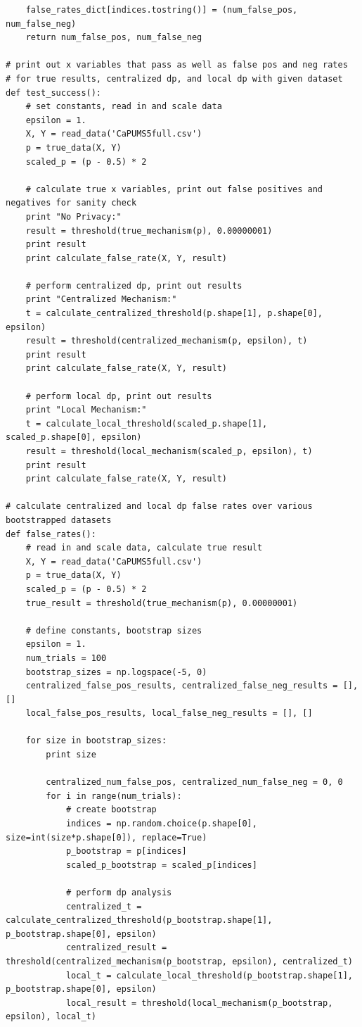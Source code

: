 \documentclass[12pt]{article}
\begin{document}
\begin{appendices}
\begin{lstlisting}
    false_rates_dict[indices.tostring()] = (num_false_pos, num_false_neg)
    return num_false_pos, num_false_neg

# print out x variables that pass as well as false pos and neg rates
# for true results, centralized dp, and local dp with given dataset
def test_success():
    # set constants, read in and scale data
    epsilon = 1.
    X, Y = read_data('CaPUMS5full.csv')
    p = true_data(X, Y)
    scaled_p = (p - 0.5) * 2

    # calculate true x variables, print out false positives and negatives for sanity check
    print "No Privacy:"
    result = threshold(true_mechanism(p), 0.00000001)
    print result
    print calculate_false_rate(X, Y, result)

    # perform centralized dp, print out results
    print "Centralized Mechanism:"
    t = calculate_centralized_threshold(p.shape[1], p.shape[0], epsilon)
    result = threshold(centralized_mechanism(p, epsilon), t)
    print result
    print calculate_false_rate(X, Y, result)

    # perform local dp, print out results
    print "Local Mechanism:"
    t = calculate_local_threshold(scaled_p.shape[1], scaled_p.shape[0], epsilon)
    result = threshold(local_mechanism(scaled_p, epsilon), t)
    print result
    print calculate_false_rate(X, Y, result)

# calculate centralized and local dp false rates over various bootstrapped datasets
def false_rates():
    # read in and scale data, calculate true result
    X, Y = read_data('CaPUMS5full.csv')
    p = true_data(X, Y)
    scaled_p = (p - 0.5) * 2
    true_result = threshold(true_mechanism(p), 0.00000001)

    # define constants, bootstrap sizes
    epsilon = 1.
    num_trials = 100
    bootstrap_sizes = np.logspace(-5, 0)
    centralized_false_pos_results, centralized_false_neg_results = [], []
    local_false_pos_results, local_false_neg_results = [], []

    for size in bootstrap_sizes:
        print size

        centralized_num_false_pos, centralized_num_false_neg = 0, 0
        for i in range(num_trials):
            # create bootstrap
            indices = np.random.choice(p.shape[0], size=int(size*p.shape[0]), replace=True)
            p_bootstrap = p[indices]
            scaled_p_bootstrap = scaled_p[indices]

            # perform dp analysis
            centralized_t = calculate_centralized_threshold(p_bootstrap.shape[1], p_bootstrap.shape[0], epsilon)
            centralized_result = threshold(centralized_mechanism(p_bootstrap, epsilon), centralized_t)
            local_t = calculate_local_threshold(p_bootstrap.shape[1], p_bootstrap.shape[0], epsilon)
            local_result = threshold(local_mechanism(p_bootstrap, epsilon), local_t)


\end{lstlisting}
\end{appendices}
\end{document}

